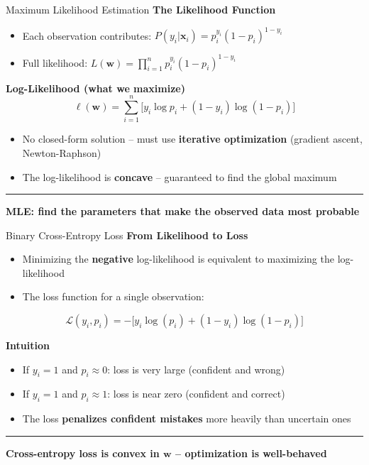 \documentclass[8pt,aspectratio=169]{beamer}
\newcommand{\bottomnote}[1]{%
\vfill
\vspace{-2mm}
\textcolor{mllavender2}{\rule{\textwidth}{0.4pt}}
\vspace{1mm}
\footnotesize
\textbf{#1}
}
\begin{document}
\begin{frame}[t]{Maximum Likelihood Estimation}
\textbf{The Likelihood Function}
\begin{itemize}
  \item Each observation contributes: $P(y_i|\mathbf{x}_i) = p_i^{y_i}(1-p_i)^{1-y_i}$
  \item Full likelihood: $L(\mathbf{w}) = \prod_{i=1}^{n} p_i^{y_i}(1-p_i)^{1-y_i}$
\end{itemize}

\vspace{0.5em}
\textbf{Log-Likelihood (what we maximize)}
\begin{equation}
\ell(\mathbf{w}) = \sum_{i=1}^{n}\bigl[y_i \log p_i + (1-y_i)\log(1-p_i)\bigr]
\end{equation}

\begin{itemize}
  \item No closed-form solution -- must use \textbf{iterative optimization} (gradient ascent, Newton-Raphson)
  \item The log-likelihood is \textbf{concave} -- guaranteed to find the global maximum
\end{itemize}
\bottomnote{MLE: find the parameters that make the observed data most probable}
\end{frame}

\begin{frame}[t]{Binary Cross-Entropy Loss}
\textbf{From Likelihood to Loss}
\begin{itemize}
  \item Minimizing the \textbf{negative} log-likelihood is equivalent to maximizing the log-likelihood
  \item The loss function for a single observation:
\end{itemize}
\begin{equation}
\mathcal{L}(y_i, p_i) = -\bigl[y_i \log(p_i) + (1-y_i)\log(1-p_i)\bigr]
\end{equation}

\vspace{0.3em}
\textbf{Intuition}
\begin{itemize}
  \item If $y_i=1$ and $p_i \approx 0$: loss is very large (confident and wrong)
  \item If $y_i=1$ and $p_i \approx 1$: loss is near zero (confident and correct)
  \item The loss \textbf{penalizes confident mistakes} more heavily than uncertain ones
\end{itemize}
\bottomnote{Cross-entropy loss is convex in $\mathbf{w}$ -- optimization is well-behaved}
\end{frame}
\end{document}
